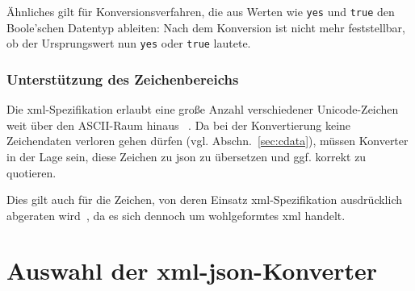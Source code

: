 Ähnliches gilt für Konversionsverfahren, die aus Werten wie \texttt{yes} und \texttt{true} den Boole'schen Datentyp ableiten: Nach dem Konversion ist nicht mehr feststellbar, ob der Ursprungswert nun \texttt{yes} oder \texttt{true} lautete.

\subsubsection{Unterstützung des Zeichenbereichs}

Die \acrshort{xml}-Spezifikation erlaubt eine große Anzahl verschiedener Unicode-Zeichen weit über den ASCII-Raum hinaus ~\cite[Regel~2]{maler2008xml}. Da bei der Konvertierung keine Zeichendaten verloren gehen dürfen (vgl. Abschn.~\ref{sec:cdata}), müssen Konverter in der Lage sein, diese Zeichen zu \acrshort{json} zu übersetzen und ggf. korrekt zu quotieren.

Dies gilt auch für die Zeichen, von deren Einsatz \acrshort{xml}-Spezifikation ausdrücklich abgeraten wird~\cite[Abschn.~2.2]{maler2008xml}, da es sich dennoch um wohlgeformtes \acrshort{xml} handelt.

\section{Auswahl der \acrshort{xml}-\acrshort{json}-Konverter}
\label{sec:converters}

